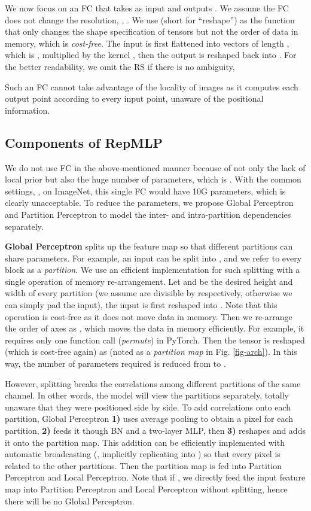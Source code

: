 \documentclass[10pt,twocolumn,letterpaper]{article}
\begin{document}
We now focus on an FC that takes  as input and outputs . We assume the FC does not change the resolution, \ie, . We use  (short for ``reshape'') as the function that only changes the shape specification of tensors but not the order of data in memory, which is \textit{cost-free}. The input is first flattened into  vectors of length , which is , multiplied by the kernel , then the output  is reshaped back into . For the better readability, we omit the RS if there is no ambiguity, 

Such an FC cannot take advantage of the locality of images as it computes each output point according to every input point, unaware of the positional information.



\subsection{Components of RepMLP}




We do not use FC in the above-mentioned manner because of not only the lack of local prior but also the huge number of parameters, which is . With the common settings, \eg,  on ImageNet, this single FC would have 10G parameters, which is clearly unacceptable. To reduce the parameters, we propose Global Perceptron and Partition Perceptron to model the inter- and intra-partition dependencies separately.



\textbf{Global Perceptron} splits up the feature map so that different partitions can share parameters. For example, an  input can be split into , and we refer to every  block as a \textit{partition}. We use an efficient implementation for such splitting with a single operation of memory re-arrangement. Let  and  be the desired height and width of every partition (we assume  are divisible by  respectively, otherwise we can simply pad the input), the input  is first reshaped into . Note that this operation is cost-free as it does not move data in memory. Then we re-arrange the order of axes as , which moves the data in memory efficiently. For example, it requires only one function call (\textit{permute}) in PyTorch. Then the  tensor is reshaped (which is cost-free again) as  (noted as a \textit{partition map} in Fig. \ref{fig-arch}). In this way, the number of parameters required is reduced from  to .

However, splitting breaks the correlations among different partitions of the same channel. In other words, the model will view the partitions separately, totally unaware that they were positioned side by side. To add correlations onto each partition, Global Perceptron \textbf{1)} uses average pooling to obtain a pixel for each partition, \textbf{2)} feeds it though BN and a two-layer MLP, then \textbf{3)} reshapes and adds it onto the partition map. This addition can be efficiently implemented with automatic broadcasting (\ie, implicitly replicating  into ) so that every pixel is related to the other partitions. Then the partition map is fed into Partition Perceptron and Local Perceptron. Note that if , we directly feed the input feature map into Partition Perceptron and Local Perceptron without splitting, hence there will be no Global Perceptron.
\end{document}

